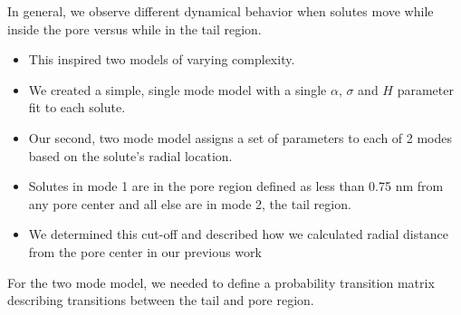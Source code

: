 \documentclass{article}
\begin{document}
  In general, we observe different dynamical behavior when solutes move while inside 
  the pore versus while in the tail region.
  \begin{itemize}
    \item This inspired two models of varying complexity.
    \item We created a simple, single mode model with a single $\alpha$, $\sigma$ and $H$
    parameter fit to each solute.
    \item Our second, two mode model assigns a set of parameters to each of 2 modes based
    on the solute's radial location.
    \item Solutes in mode 1 are in the pore region defined as less than 0.75 nm from any
    pore center and all else are in mode 2, the tail region. 
    \item We determined this cut-off and described how we calculated radial 
    distance from the pore center in our previous work~\cite{coscia_chemically_2019}
  \end{itemize}
  
  For the two mode model, we needed to define a probability transition matrix 
  describing transitions between the tail and pore region. \\

\end{document}
